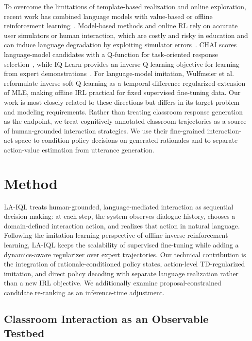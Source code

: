 \documentclass[manuscript,review,anonymous]{acmart}
\begin{document}
To overcome the limitations of template-based realization and online exploration, recent work has combined language models with value-based or offline reinforcement learning~\citep{jaques2020way, verma2022chai}.
Model-based methods and online RL rely on accurate user simulators or human interaction, which are costly and risky in education and can induce language degradation by exploiting simulator errors~\citep{christiano2017deep, ouyang2022training}.
CHAI scores language-model candidates with a Q-function for task-oriented response selection~\citep{verma2022chai}, while IQ-Learn provides an inverse Q-learning objective for learning from expert demonstrations~\citep{garg2021iqlearn}.
For language-model imitation, Wulfmeier et al.~\citep{wulfmeier2024imitating} reformulate inverse soft Q-learning as a temporal-difference regularized extension of MLE, making offline IRL practical for fixed supervised fine-tuning data.
Our work is most closely related to these directions but differs in its target problem and modeling requirements.
Rather than treating classroom response generation as the endpoint, we treat
cognitively annotated classroom trajectories as a source of human-grounded
interaction strategies. We use their fine-grained interaction-act space to
condition policy decisions on generated rationales and to separate action-value
estimation from utterance generation.

\section{Method}

LA-IQL treats human-grounded, language-mediated interaction as sequential
decision making: at each step, the system observes dialogue history, chooses a
domain-defined interaction action, and realizes that action in natural
language.
Following the imitation-learning perspective of offline inverse reinforcement learning, LA-IQL keeps the scalability of supervised fine-tuning while adding a dynamics-aware regularizer over expert trajectories.
Our technical contribution is the integration of rationale-conditioned policy states, action-level TD-regularized imitation, and direct policy decoding with separate language realization rather than a new IRL objective. We additionally examine proposal-constrained candidate re-ranking as an inference-time adjustment.

\subsection{Classroom Interaction as an Observable Testbed}
\label{sec:problem}
\end{document}
